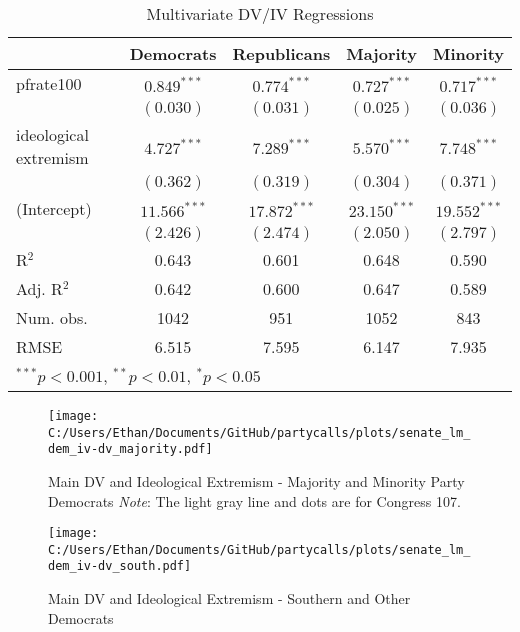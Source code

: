 \documentclass[12pt]{article}
\begin{document}
\begin{table}
	\begin{center}
		\caption{Multivariate DV/IV Regressions}
		\begin{tabular}{l c c c c }
			\hline
			& Democrats & Republicans & Majority & Minority \\
			\hline
			pfrate100              & $0.849^{***}$  & $0.774^{***}$  & $0.727^{***}$  & $0.717^{***}$  \\
			& $(0.030)$      & $(0.031)$      & $(0.025)$      & $(0.036)$      \\
			ideological extremism & $4.727^{***}$  & $7.289^{***}$  & $5.570^{***}$  & $7.748^{***}$  \\
			& $(0.362)$      & $(0.319)$      & $(0.304)$      & $(0.371)$      \\
			(Intercept)            & $11.566^{***}$ & $17.872^{***}$ & $23.150^{***}$ & $19.552^{***}$ \\
			& $(2.426)$      & $(2.474)$      & $(2.050)$      & $(2.797)$      \\
			\hline
			R$^2$                  & 0.643          & 0.601          & 0.648          & 0.590          \\
			Adj. R$^2$             & 0.642          & 0.600          & 0.647          & 0.589          \\
			Num. obs.              & 1042           & 951            & 1052           & 843            \\
			RMSE                   & 6.515          & 7.595          & 6.147          & 7.935          \\
			\hline
			\multicolumn{5}{l}{\scriptsize{$^{***}p<0.001$, $^{**}p<0.01$, $^*p<0.05$}}
		\end{tabular}
	\end{center}
\end{table}

\begin{figure}[h]
	\caption{Main DV and Ideological Extremism - Majority and Minority Party Democrats \textit{Note}: The light gray line and dots are for Congress 107.}
	\texttt{[image: C:/Users/Ethan/Documents/GitHub/partycalls/plots/senate\_lm\_dem\_iv-dv\_majority.pdf]}
\end{figure}

\begin{figure}[h]
	\caption{Main DV and Ideological Extremism - Southern and Other Democrats}
	\texttt{[image: C:/Users/Ethan/Documents/GitHub/partycalls/plots/senate\_lm\_dem\_iv-dv\_south.pdf]}
\end{figure}
\end{document}
